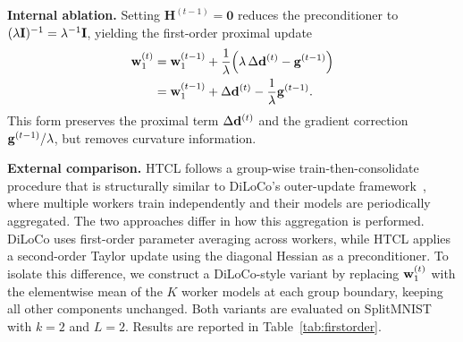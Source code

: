 {\textbf{Internal ablation.} Setting $\mathbf{H}^{(t-1)} = \mathbf{0}$ reduces the preconditioner to $(\lambda \mathbf{I})^{-1} = \lambda^{-1}\mathbf{I}$, yielding the first-order proximal update
\begin{equation}
\label{eq:firstorder}
\begin{aligned}
\mathbf{w}_{1}^{(t)} &= \mathbf{w}_{1}^{(t-1)} + \frac{1}{\lambda}\!\left(\lambda\,\Delta\mathbf{d}^{(t)} - \mathbf{g}^{(t-1)}\right) \\
&= \mathbf{w}_{1}^{(t-1)} + \Delta\mathbf{d}^{(t)} - \frac{1}{\lambda}\mathbf{g}^{(t-1)}.
\end{aligned}
\end{equation}
This form preserves the proximal term $\Delta\mathbf{d}^{(t)}$ and the gradient correction $\mathbf{g}^{(t-1)}/\lambda$, but removes curvature information.

\textbf{External comparison.} HTCL follows a group-wise train-then-consolidate procedure that is structurally similar to DiLoCo's outer-update framework~\cite{douillard2023diloco}, where multiple workers train independently and their models are periodically aggregated. The two approaches differ in how this aggregation is performed. DiLoCo uses first-order parameter averaging across workers, while HTCL applies a second-order Taylor update using the diagonal Hessian as a preconditioner. To isolate this difference, we construct a DiLoCo-style variant by replacing $\mathbf{w}_{1}^{(t)}$ with the elementwise mean of the $K$ worker models at each group boundary, keeping all other components unchanged. Both variants are evaluated on SplitMNIST with $k = 2$ and $L = 2$. Results are reported in Table~\ref{tab:firstorder}.

}
